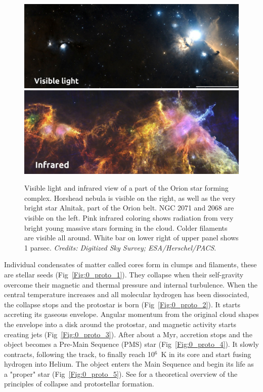 \begin{figure}
\center
\includegraphics[width=0.95\linewidth]{Figures/0_horsehead_visible2}
\includegraphics[width=0.95\linewidth]{Figures/0_horsehead_infrared}
\caption[Visible light  and infrared view of a part of the Orion star forming complex]{Visible light  and infrared view of a part of the Orion star forming complex. Horshead nebula is visible on the right, as well as the very bright star Alnitak, part of the Orion belt. NGC 2071 and 2068 are visible on the left. Pink infrared coloring shows radiation from very bright young massive stars forming in the cloud. Colder filaments are visible all around. White bar on lower right of upper panel shows 1 parsec. \textit{Credits: Digitized Sky Survey; ESA/Herschel/PACS}. }
\label{Fig:0_horsehead}
\end{figure}

Individual condensates of matter called cores form in clumps and filaments, these are stellar seeds (Fig~\ref{Fig:0_proto_1}). They collapse when their self-gravity overcome their magnetic and thermal pressure and internal turbulence. When the central temperature increases and all molecular hydrogen has been dissociated, the collapse stops and the protostar is born (Fig~\ref{Fig:0_proto_2}). It starts accreting its gaseous envelope. Angular momentum from the original cloud shapes the envelope into a disk around the protostar, and magnetic activity starts creating jets (Fig~\ref{Fig:0_proto_3}). After about a Myr, accretion stops and the object becomes a Pre-Main Sequence (PMS) star (Fig~\ref{Fig:0_proto_4}). It slowly contracts, following the \cite{Hayashi1961} track, to finally reach 10$^6$~K in its core and start fusing hydrogen into Helium. The  object enters the Main Sequence and begin its life as a "proper" star (Fig~\ref{Fig:0_proto_5}). See \cite{Larson1969} for a theoretical overview of the principles of collapse and protostellar formation. 

